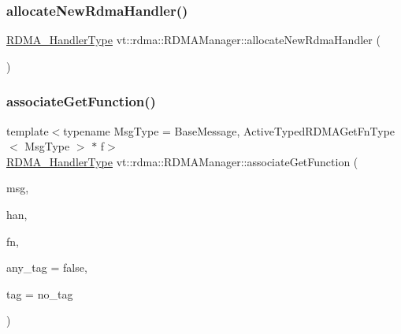 \subsubsection{\texorpdfstring{allocate\+New\+Rdma\+Handler()}{allocateNewRdmaHandler()}}
{\footnotesize\ttfamily \hyperlink{namespacevt_a9530efb893c0f3846e8ac5f0507e0f49}{R\+D\+M\+A\+\_\+\+Handler\+Type} vt\+::rdma\+::\+R\+D\+M\+A\+Manager\+::allocate\+New\+Rdma\+Handler (\begin{DoxyParamCaption}{ }\end{DoxyParamCaption})}

\mbox{\label{structvt_1_1rdma_1_1_r_d_m_a_manager_abcddc1a18794163032758fcf035ff406}} 
\subsubsection{\texorpdfstring{associate\+Get\+Function()}{associateGetFunction()}}
{\footnotesize\ttfamily template$<$typename Msg\+Type  = Base\+Message, Active\+Typed\+R\+D\+M\+A\+Get\+Fn\+Type$<$ Msg\+Type $>$ $\ast$ f$>$ \\
\hyperlink{namespacevt_a9530efb893c0f3846e8ac5f0507e0f49}{R\+D\+M\+A\+\_\+\+Handler\+Type} vt\+::rdma\+::\+R\+D\+M\+A\+Manager\+::associate\+Get\+Function (\begin{DoxyParamCaption}\item[{Msg\+Type $\ast$}]{msg,  }\item[{\hyperlink{namespacevt_a10442579ec4e7ebef223818e64bcf908}{R\+D\+M\+A\+\_\+\+Handle\+Type} const \&}]{han,  }\item[{\hyperlink{structvt_1_1rdma_1_1_r_d_m_a_manager_a0d865535d118fe9dcab074fd3df74ce1}{R\+D\+M\+A\+\_\+\+Get\+Typed\+Function\+Type}$<$ Msg\+Type $>$ const \&}]{fn,  }\item[{bool const \&}]{any\+\_\+tag = {\ttfamily false},  }\item[{\hyperlink{namespacevt_a84ab281dae04a52a4b243d6bf62d0e52}{Tag\+Type} const \&}]{tag = {\ttfamily no\+\_\+tag} }\end{DoxyParamCaption})\hspace{0.3cm}{\ttfamily [inline]}}

\mbox{\label{structvt_1_1rdma_1_1_r_d_m_a_manager_a5092afb73c1a6fb69cb211f23eb704cb}} 
